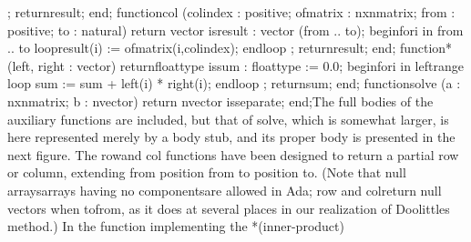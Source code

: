 \tyxtstxendbf[];
      \tyxtstxbf[]return\tyxtstxendbf[] result;
   \tyxtstxbf[]end\tyxtstxendbf[];
   \tyxtstxbf[]function\tyxtstxendbf[] col (col\Symuns[]index : positive;
                 of\Symuns[]matrix : nxn\Symuns[]matrix;
                 from      : positive;
                 to        : natural) \tyxtstxbf[]return%
\tyxtstxendbf[] vector \tyxtstxbf[]is\tyxtstxendbf[]
      result : vector (from .. to);
   \tyxtstxbf[]begin\tyxtstxendbf[]
      \tyxtstxbf[]for\tyxtstxendbf[] i \tyxtstxbf[]in%
\tyxtstxendbf[] from .. to \tyxtstxbf[]loop\tyxtstxendbf[]
         result(i) := of\Symuns[]matrix(i,col\Symuns[]index);
      \tyxtstxbf[]end\tyxtstxendbf[] \tyxtstxbf[]loop%
\tyxtstxendbf[];
      \tyxtstxbf[]return\tyxtstxendbf[] result;
   \tyxtstxbf[]end\tyxtstxendbf[];
   \tyxtstxbf[]function\tyxtstxendbf[] \quot[]*\quot[] (left, right : vector) %
\tyxtstxbf[]return\tyxtstxendbf[] float\Symuns[]type %
\tyxtstxbf[]is\tyxtstxendbf[]
      sum : float\Symuns[]type := 0.0;
   \tyxtstxbf[]begin\tyxtstxendbf[]
      \tyxtstxbf[]for\tyxtstxendbf[] i \tyxtstxbf[]in%
\tyxtstxendbf[] left\rsquo[]range \tyxtstxbf[]loop%
\tyxtstxendbf[]
         sum := sum + left(i) * right(i);
      \tyxtstxbf[]end\tyxtstxendbf[] \tyxtstxbf[]loop%
\tyxtstxendbf[];
      \tyxtstxbf[]return\tyxtstxendbf[] sum;
   \tyxtstxbf[]end\tyxtstxendbf[];
   \tyxtstxbf[]function\tyxtstxendbf[] solve (a : nxn\Symuns[]matrix;
                   b : n\Symuns[]vector) \tyxtstxbf[]return%
\tyxtstxendbf[] n\Symuns[]vector \tyxtstxbf[]is\tyxtstxendbf[] %
\tyxtstxbf[]separate\tyxtstxendbf[];
\tyxtstxbf[]end\tyxtstxendbf[];\Endcomp[]
\EndParbox[]
\FgEndblock[]
 The full bodies of the auxiliary functions are included, but that
of \tyxffmxmono[]solve\tyxffmxendmono[], which is somewhat larger,
is here represented merely by a body stub, and its proper body is
presented in the next figure. The
\TyPbrkNewp[]
 \tyxffmxmono[]row\tyxffmxendmono[] and \tyxffmxmono[]col%
\tyxffmxendmono[] functions have been designed to return a partial
row or column, extending from position \tyxffmxmono[]from%
\tyxffmxendmono[] to position \tyxffmxmono[]to\tyxffmxendmono[]. (Note
that \txtxemph[]null arrays\txtxendemph[]\EmDash[]arrays having no
components\EmDash[]are allowed in Ada; \tyxffmxmono[]row%
\tyxffmxendmono[] and \tyxffmxmono[]col\tyxffmxendmono[] return null
vectors when \tyxffmxmono[]to\tyxffmxendmono[] \mthxsyxlt[] %
\tyxffmxmono[]from\tyxffmxendmono[], as it does at several places
in our realization of Doolittle\rsquo[]s method.) In the function
implementing the \tyxffmxmono[]*\tyxffmxendmono[] (inner-product)
